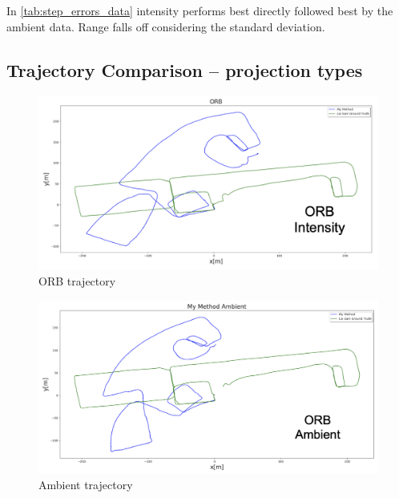 {{{    In \cref{tab:step_errors_data} intensity performs best directly followed best by the ambient data. Range falls off considering the standard deviation.
    }

    
    
    \subsection{Trajectory Comparison – projection types}{

        \begin{figure}[!ht]
            \centering
            \includegraphics[scale = 0.5]{images/comparison_appendix/ORBt.png}
            \caption{ORB trajectory}
            \label{fig:ORB_trajectory_data}
        \end{figure}
        \clearpage

        \begin{figure}[!ht]
            \centering
            \includegraphics[scale = 0.5]{images/comparison_appendix/Ambientt.png}
            \caption{Ambient trajectory}
            \label{fig:ambient_trajectory}
        \end{figure}

}}}
